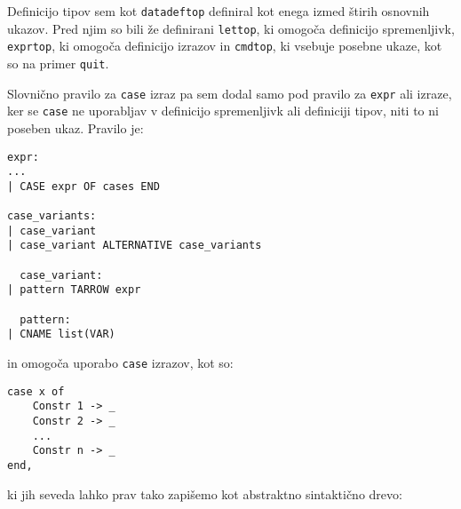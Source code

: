 \documentclass[12pt,a4paper,openany]{book}
\begin{document}
Definicijo tipov sem kot \lstinline{datadeftop} definiral kot enega izmed štirih osnovnih ukazov. Pred njim so bili že definirani \lstinline{lettop}, ki omogoča definicijo 
spremenljivk, \lstinline{exprtop}, ki omogoča definicijo izrazov in \lstinline{cmdtop}, ki vsebuje posebne ukaze, kot so na primer \lstinline{quit}.

Slovnično pravilo za \lstinline{case} izraz pa sem dodal samo pod pravilo za \lstinline{expr} ali izraze, ker se \lstinline{case} ne uporabljav v definicijo spremenljivk ali
definiciji tipov, niti to ni poseben ukaz. Pravilo je: 
\begin{lstlisting}
expr:
...
| CASE expr OF cases END

case_variants:
| case_variant
| case_variant ALTERNATIVE case_variants

  case_variant:
| pattern TARROW expr

  pattern:
| CNAME list(VAR)
\end{lstlisting}
in omogoča uporabo \lstinline{case} izrazov, kot so:
\begin{lstlisting}
case x of 
    Constr 1 -> _
    Constr 2 -> _
    ...
    Constr n -> _
end,
\end{lstlisting}
ki jih seveda lahko prav tako zapišemo kot abstraktno sintaktično drevo:
\begin{center}
\end{center}
\end{document}
